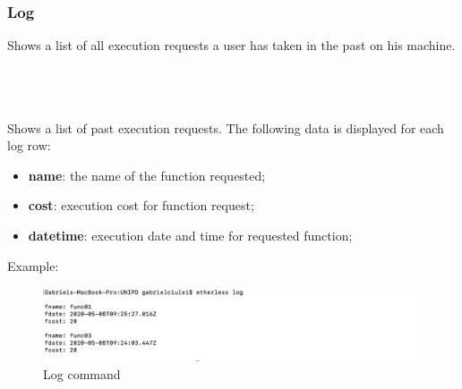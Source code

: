 \subsubsection{Log}
Shows a list of all execution requests a user has taken in the past on his machine.\\\\
\centerline {}\\\\
Shows a list of past execution requests. The following data is displayed for each log row:
\begin{itemize}
	\item \textbf{name}: the name of the function requested;
	\item \textbf{cost}: execution cost for function request;
	\item \textbf{datetime}: execution date and time for requested function;
\end{itemize}
Example:
\begin{figure}[h]
	\begin{center}
	\includegraphics[width=\textwidth]{res/img/log.png}
	\caption{Log command}
	\end{center}
\end{figure}
